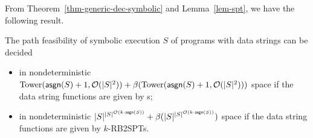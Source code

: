 From Theorem~\ref{thm-generic-dec-symbolic} and Lemma~\ref{lem-spt}, we have the following result.
\begin{theorem}\label{thm-spt}
The path feasibility of symbolic execution $S$ of programs with data strings can be decided 

\begin{itemize}
	\item in nondeterministic $\mathrm{Tower}(\mathsf{asgn}(S)+1, \mathcal{O}(|S|^2)) + \beta(\mathrm{Tower}(\mathsf{asgn}(S)+1, \mathcal{O}(|S|^2)))$  space if the data string functions are given by \SSPT{}s;
	
	\item  in nondeterministic $|S|^{|S|^{\mathcal{O}(k\cdot \mathsf{asgn}(S))}} + \beta(|S|^{|S|^{\mathcal{O}(k\cdot \mathsf{asgn}(S))}})$ space if the data string functions are given by $k$-RB2SPTs. %
	
\end{itemize}
%
%
\end{theorem}

